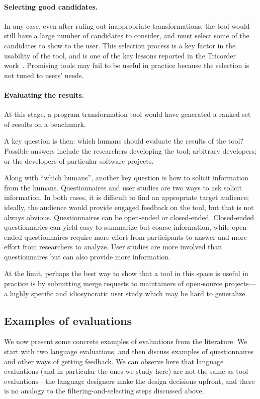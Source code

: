 \paragraph{Selecting good candidates.} In any case, even after ruling out 
inappropriate transformations, the tool would still have a large
number of candidates to consider, and must select some of the
candidates to show to the user. This selection process is a key factor
in the usability of the tool, and is one of the key lessons reported
in the Tricorder
work~\cite{sadowski18:_lesson_build_static_analy_tools_googl}.
Promising tools may fail to be useful in practice because the
selection is not tuned to users' needs.

\paragraph{Evaluating the results.} At this stage, a program
transformation tool would have generated a ranked set of results on a
benchmark.  

A key question is then: which humans should evaluate the
results of the tool?  Possible answers include the researchers
developing the tool; arbitrary developers; or the developers of
particular software projects.

Along with ``which humans'', another key question is how to solicit
information from the humans. Questionnaires and user studies are two
ways to ask solicit information. In both cases, it is difficult to
find an appropriate target audience; ideally, the audience would
provide engaged feedback on the tool, but that is not always obvious.
Questionnaires can be open-ended or closed-ended. Closed-ended
questionnaries can yield easy-to-summarize but coarse information,
while open-ended questionnaires require more effort from participants
to answer and more effort from researchers to analyze. User studies
are more involved than questionnaires but can also provide more information.

At the limit, perhaps the
best way to show that a tool in this space is useful in practice is by
submitting merge requests to maintainers of open-source projects---a 
highly specific and idiosyncratic user study which may be hard to generalize.

\subsection{Examples of evaluations}
We now present some concrete examples of evaluations from the
literature. We start with two language evaluations, and then
discuss examples of questionnaires and other ways of getting feedback. We can observe
here that language evaluations (and in particular the ones we study
here) are not the same as tool evaluations---the language designers
make the design decisions upfront, and there is no analogy to the
filtering-and-selecting steps discussed above.

